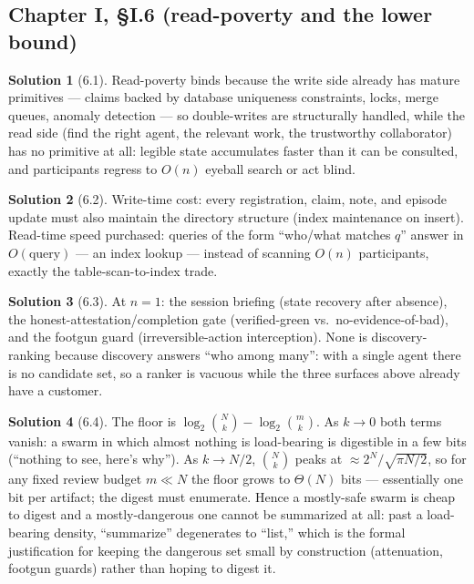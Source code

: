 \documentclass[11pt,a4paper]{article}
\theoremstyle{definition}
\newtheorem{sol}{Solution}
\theoremstyle{remark}
\begin{document}
\subsection{Chapter I, \S I.6 (read-poverty and the lower bound)}

\begin{sol}[6.1]
Read-poverty binds because the write side already has mature primitives --- claims backed by database uniqueness constraints, locks, merge queues, anomaly detection --- so double-writes are structurally handled, while the read side (find the right agent, the relevant work, the trustworthy collaborator) has no primitive at all: legible state accumulates faster than it can be consulted, and participants regress to $O(n)$ eyeball search or act blind.
\end{sol}

\begin{sol}[6.2]
Write-time cost: every registration, claim, note, and episode update must also maintain the directory structure (index maintenance on insert). Read-time speed purchased: queries of the form ``who/what matches $q$'' answer in $O(\text{query})$ --- an index lookup --- instead of scanning $O(n)$ participants, exactly the table-scan-to-index trade.
\end{sol}

\begin{sol}[6.3]
At $n{=}1$: the session briefing (state recovery after absence), the honest-attestation/completion gate (verified-green vs.\ no-evidence-of-bad), and the footgun guard (irreversible-action interception). None is discovery-ranking because discovery answers ``who among many'': with a single agent there is no candidate set, so a ranker is vacuous while the three surfaces above already have a customer.
\end{sol}

\begin{sol}[6.4]
The floor is $\log_2\binom{N}{k} - \log_2\binom{m}{k}$. As $k \to 0$ both terms vanish: a swarm in which almost nothing is load-bearing is digestible in a few bits (``nothing to see, here's why''). As $k \to N/2$, $\binom{N}{k}$ peaks at $\approx 2^N/\sqrt{\pi N/2}$, so for any fixed review budget $m \ll N$ the floor grows to $\Theta(N)$ bits --- essentially one bit per artifact; the digest must enumerate. Hence a mostly-safe swarm is cheap to digest and a mostly-dangerous one cannot be summarized at all: past a load-bearing density, ``summarize'' degenerates to ``list,'' which is the formal justification for keeping the dangerous set small by construction (attenuation, footgun guards) rather than hoping to digest it.
\end{sol}
\end{document}
